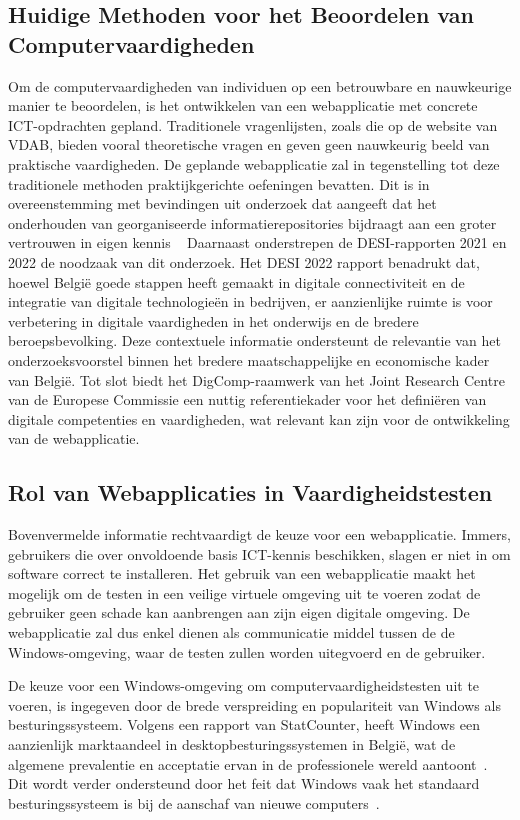 \subsection{Huidige Methoden voor het Beoordelen van Computervaardigheden}
Om de computervaardigheden van individuen op een betrouwbare en nauwkeurige manier te beoordelen, is het ontwikkelen van een webapplicatie met concrete ICT-opdrachten gepland. Traditionele vragenlijsten, zoals die op de website van VDAB, bieden vooral theoretische vragen en geven geen nauwkeurig beeld van praktische vaardigheden.
De geplande webapplicatie zal in tegenstelling tot deze traditionele methoden praktijkgerichte oefeningen bevatten. Dit is in overeenstemming met bevindingen uit onderzoek dat aangeeft dat het onderhouden van georganiseerde informatierepositories bijdraagt aan een groter vertrouwen in eigen kennis ~\textcite{JudgingKnowledge}
Daarnaast onderstrepen de DESI-rapporten 2021 en 2022 de noodzaak van dit onderzoek. Het DESI 2022 rapport benadrukt dat, hoewel België goede stappen heeft gemaakt in digitale connectiviteit en de integratie van digitale technologieën in bedrijven, er aanzienlijke ruimte is voor verbetering in digitale vaardigheden in het onderwijs en de bredere beroepsbevolking. Deze contextuele informatie ondersteunt de relevantie van het onderzoeksvoorstel binnen het bredere maatschappelijke en economische kader van België.
Tot slot biedt het DigComp-raamwerk van het Joint Research Centre van de Europese Commissie een nuttig referentiekader voor het definiëren van digitale competenties en vaardigheden, wat relevant kan zijn voor de ontwikkeling van de webapplicatie. ~\textcite{DigCompFramework}

\subsection{Rol van Webapplicaties in Vaardigheidstesten}
Bovenvermelde informatie rechtvaardigt de ke\-uze voor een webapplicatie. Immers, gebruikers die over onvoldoende basis ICT-kennis beschikken, slagen er niet in om software correct te installeren. Het gebruik van een webapplicatie maakt het mogelijk om de testen in een veilige virtuele omgeving uit te voeren zodat de gebruiker geen schade kan aanbrengen aan zijn eigen digitale omgeving. De webapplicatie zal dus enkel dienen als communicatie middel tussen de de Windows-omgeving, waar de testen zullen worden uitegvoerd en de gebruiker.

De keuze voor een Windows-omgeving om computervaardigheidstesten uit te voeren, is ingegeven door de brede verspreiding en populariteit van Windows als besturingssysteem. Volgens een rapport van StatCounter, heeft Windows een aanzienlijk marktaandeel in desktopbesturingssystemen in België, wat de algemene prevalentie en acceptatie ervan in de professionele wereld aantoont~\autocite{StatCounterOSMarketShare}. Dit wordt verder ondersteund door het feit dat Windows vaak het standaard besturingssysteem is bij de aanschaf van nieuwe computers~\autocite{ProfolusWindowsPopularity}.

